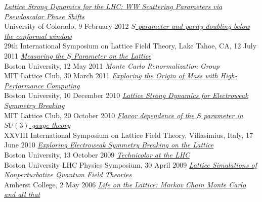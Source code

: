 \begin{spacelistout}
\begin{revnumerate}
    \pagebreakitem
      \textit{\href{http://www.davidschaich.net/talks/1202WW.pdf}{Lattice Strong Dynamics for the LHC: WW Scattering Parameters via Pseudoscalar Phase Shifts}} \\
      University of Colorado, 9 February 2012
    \pagebreakitem
      \textit{\href{http://www.davidschaich.net/talks/Lattice11.pdf}{$S$ parameter and parity doubling below the conformal window}} \\ %
      29th International Symposium on Lattice Field Theory, Lake Tahoe, CA, 12 July 2011
    \pagebreakitem
      \textit{\href{http://www.davidschaich.net/talks/defense.pdf}{Measuring the $S$ Parameter on the Lattice}} \\
      Boston University, 12 May 2011
    \pagebreakitem
      \textit{Monte Carlo Renormalization Group} \\
      MIT Lattice Club, 30 March 2011
    \pagebreakitem
      \textit{\href{http://www.davidschaich.net/talks/BUseminar.pdf}{Exploring the Origin of Mass with High-Performance Computing}} \\
      Boston University, 10 December 2010
    \pagebreakitem
      \textit{\href{http://www.davidschaich.net/talks/1010MIT.pdf}{Lattice Strong Dynamics for Electroweak Symmetry Breaking}} \\
      MIT Lattice Club, 20 October 2010
    \pagebreakitem
      \textit{\href{http://www.davidschaich.net/talks/Lattice10.pdf}{Flavor dependence of the $S$ parameter in $SU(3)$ gauge theory}} \\ %
      XXVIII International Symposium on Lattice Field Theory, Villasimius, Italy, 17 June 2010
    \pagebreakitem
      \textit{\href{http://www.davidschaich.net/talks/EWSB_lattice.pdf}{Exploring Electroweak Symmetry Breaking on the Lattice}} \\
      Boston University, 13 October 2009
    \pagebreakitem
      \textit{\href{http://www.davidschaich.net/talks/TC_LHC.pdf}{Technicolor at the LHC}} \\
      Boston University LHC Physics Symposium, 30 April 2009
    \pagebreakitem
      \textit{\href{http://www.davidschaich.net/talks/thesisDefense.pdf}{Lattice Simulations of Nonperturbative Quantum Field Theories}} \\
      Amherst College, 2 May 2006
    \pagebreakitem
      \textit{\href{http://www.davidschaich.net/talks/thesisTalk.pdf}{Life on the Lattice: Markov Chain Monte Carlo and all that}} \\

\end{revnumerate}
\end{spacelistout}
